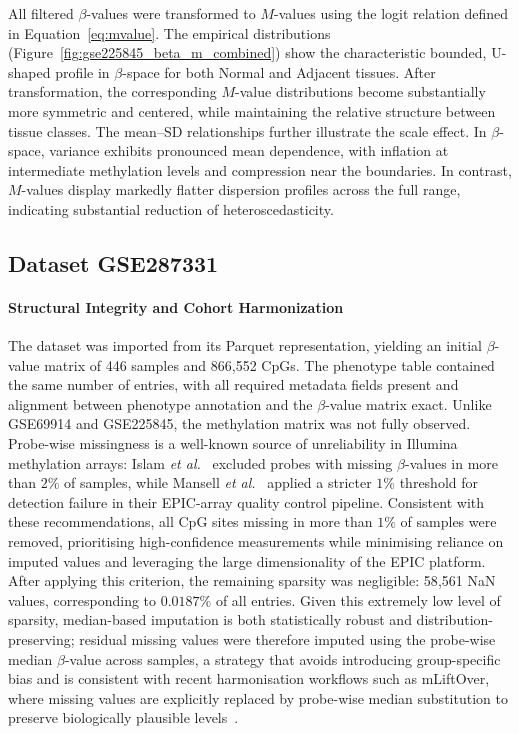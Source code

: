All filtered $\beta$-values were transformed to $M$-values using the logit relation defined in Equation~\eqref{eq:mvalue}. 
The empirical distributions (Figure~\ref{fig:gse225845_beta_m_combined}) show the characteristic bounded, U-shaped profile in $\beta$-space for both Normal and Adjacent tissues. After transformation, the corresponding $M$-value distributions become substantially more symmetric and centered, while maintaining the relative structure between tissue classes.
The mean--SD relationships further illustrate the scale effect. In $\beta$-space, variance exhibits pronounced mean dependence, with inflation at intermediate methylation levels and compression near the boundaries. In contrast, $M$-values display markedly flatter dispersion profiles across the full range, indicating substantial reduction of heteroscedasticity. 



\subsection{Dataset GSE287331}
\label{subsec:gse287331_data_prep}



\paragraph{Structural Integrity and Cohort Harmonization}
\label{par:gse287331_missingness}

The dataset was imported from its Parquet representation, yielding an initial
$\beta$-value matrix of 446 samples and 866{,}552 CpGs. The phenotype table
contained the same number of entries, with all required metadata fields present
and alignment between phenotype annotation and the $\beta$-value matrix exact.
Unlike GSE69914 and GSE225845, the methylation matrix was not fully observed.
Probe-wise missingness is a well-known source of unreliability in Illumina
methylation arrays: Islam \textit{et al.}~\cite{islam2019_pediatric_dnamm}
excluded probes with missing $\beta$-values in more than $2\%$ of samples,
while Mansell \textit{et al.}~\cite{mansell2019guidance} applied a stricter
$1\%$ threshold for detection failure in their EPIC-array quality control
pipeline. Consistent with these recommendations, all CpG sites missing in more
than $1\%$ of samples were removed, prioritising high-confidence measurements
while minimising reliance on imputed values and leveraging the large
dimensionality of the EPIC platform. After applying this criterion, the
remaining sparsity was negligible: 58{,}561 NaN values, corresponding to
$0.0187\%$ of all entries. Given this extremely low level of sparsity,
median-based imputation is both statistically robust and
distribution-preserving; residual missing values were therefore imputed using
the probe-wise median $\beta$-value across samples, a strategy that avoids
introducing group-specific bias and is consistent with recent harmonisation
workflows such as mLiftOver, where missing values are explicitly replaced by
probe-wise median substitution to preserve biologically plausible
levels~\cite{chen2024_mliftover}.

